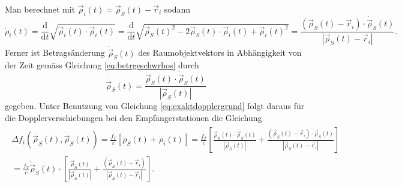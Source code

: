 \documentclass[a4paper,12pt]{article}
\numberwithin{equation}{section}
\begin{document}
Man berechnet mit $\vec{\rho}_i(t) = \vec{\rho}_S(t)-\vec{r}_i$  sodann \small \begin{equation}
\dot{\rho}_i(t) = \frac{\mathrm{d}}{\mathrm{d}t}\sqrt{\vec{\rho}_i(t)\cdot\vec{\rho}_i(t)} = \frac{\mathrm{d}}{\mathrm{d}t}\sqrt{\vec{\rho}_S(t)^2-2\vec{\rho}_S(t)\cdot\vec{\rho}_i(t)+\vec{\rho}_i(t)^2} = \frac{(\vec{\rho}_S(t)-\vec{r}_i)\cdot \dot{\vec{\rho}}_S(t)}{|\vec{\rho}_S(t)-\vec{r}_i|}.
\end{equation} \normalsize Ferner ist Betragsänderung $\dot{\vec{\rho}}_S(t)$ des Raumobjektvektors in Abhängigkeit von der Zeit gemäss Gleichung \eqref{eq:betrgeschwrhos} durch \begin{equation}\dot{\vec{\rho}}_S(t) =\frac{\vec{\rho}_S(t)\cdot \dot{\vec{\rho}}_S(t)}{|\vec{\rho}_S(t)|}\end{equation} gegeben. Unter Benutzung von Gleichung \eqref{eq:exaktdopplergrund} folgt daraus für die Dopplerverschiebungen bei den Empfängerstationen die Gleichung \begin{gather}
\begin{gathered}
\Delta f_i(\vec{\rho}_S(t),\dot{\vec{\rho}}_S(t)) = \frac{f_T}{c}[\dot{\rho}_S(t)+\dot{\rho}_i(t)] = \frac{f_T}{c}\left[\frac{\vec{\rho}_S(t)\cdot \dot{\vec{\rho}}_S(t)}{|\vec{\rho}_S(t)|}+\frac{(\vec{\rho}_S(t)-\vec{r}_i)\cdot \dot{\vec{\rho}}_S(t)}{|\vec{\rho}_S(t)-\vec{r}_i|}\right] \\ = \frac{f_T}{c}\dot{\vec{\rho}}_S(t)\cdot \left[\frac{\vec{\rho}_S(t)}{|\vec{\rho}_S(t)|}+\frac{(\vec{\rho}_S(t)-\vec{r}_i)}{|\vec{\rho}_S(t)-\vec{r}_i|}\right].
\end{gathered}
\end{gather}
\end{document}
